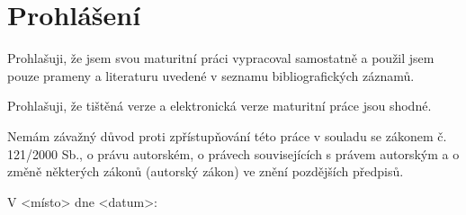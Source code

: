 \section*{Prohlášení}

Prohlašuji, že jsem svou maturitní práci vypracoval samostatně a použil jsem
pouze prameny a literaturu uvedené v seznamu bibliografických záznamů.

Prohlašuji, že tištěná verze a elektronická verze maturitní práce jsou shodné.

Nemám závažný důvod proti zpřístupňování této práce v souladu se zákonem č.
121/2000 Sb., o právu autorském, o právech souvisejících s právem autorským a o
změně některých zákonů (autorský zákon) ve znění pozdějších předpisů.

V <místo> dne <datum>: \hrulefill
